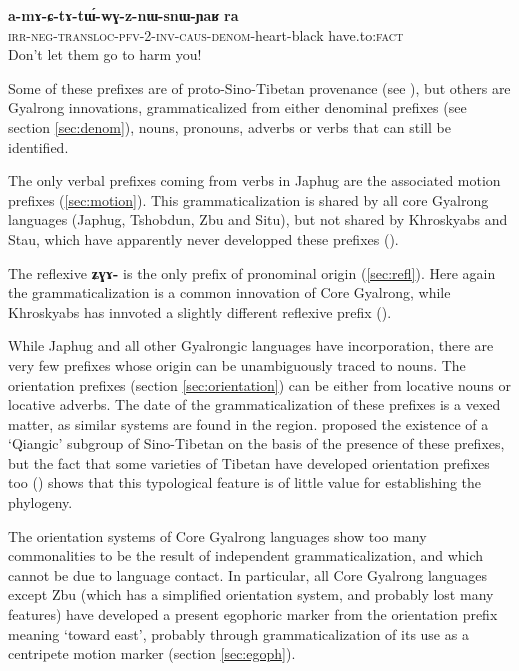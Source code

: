 \documentclass[oldfontcommands,oneside,a4paper,11pt]{article}
\newcommand{\ipa}[1]{\mbox{\phon\textbf{#1}}} %
\begin{document}
\begin{exe}
\ex  \label{ex:amaCtAtWwGznWsnWYaR}
\gll
	\ipa{a-mɤ-ɕ-tɤ-tɯ́-wɣ-z-nɯ-snɯ-ɲaʁ}  	\ipa{ra}  \\
  \textsc{irr-neg-transloc-pfv-2-inv-caus-denom}-heart-black have.to:\textsc{fact} \\
\glt Don't let them go to harm you!
\end{exe} 

Some of these prefixes are of proto-Sino-Tibetan provenance (see \citealt{delancey11prefixes, delancey14second, jacques12agreement}), but others are Gyalrong innovations, grammaticalized from either denominal prefixes (see section \ref{sec:denom}), nouns, pronouns, adverbs or verbs that can still be identified.

The only verbal prefixes coming from verbs in Japhug are the associated motion prefixes (\ref{sec:motion}). This grammaticalization is shared by all core Gyalrong languages (Japhug, Tshobdun, Zbu and Situ), but not shared by Khroskyabs and Stau, which have apparently never developped these prefixes (\citealt{lai13affixale}).

The reflexive \ipa{ʑɣɤ-} is the only prefix of pronominal origin (\ref{sec:refl}). Here again the grammaticalization is a common innovation of Core Gyalrong, while Khroskyabs has innvoted a slightly different reflexive prefix  (\citealt[156-7]{lai13affixale}).

While Japhug and all other Gyalrongic languages have incorporation, there are very few prefixes whose origin can be unambiguously traced to nouns. The orientation prefixes (section \ref{sec:orientation}) can be either from locative nouns or locative adverbs. The date of the grammaticalization of these prefixes is a vexed matter, as similar systems are found in the region. \citet{sun83liujiang} proposed the existence of a `Qiangic' subgroup of Sino-Tibetan on the basis of the presence of these prefixes, but the fact that some varieties of Tibetan have developed orientation prefixes too (\citealt{jackson07khalong}) shows that this typological feature is of little value for establishing the phylogeny.

The orientation systems of Core Gyalrong languages show too many commonalities to be the result of independent grammaticalization, and which cannot be due to language contact. In particular, all Core Gyalrong languages except Zbu (which has a simplified orientation system, and probably lost many features) have developed a present egophoric marker from the orientation prefix meaning `toward east', probably through grammaticalization of its use as a centripete motion marker (section \ref{sec:egoph}).
 
\end{document}
